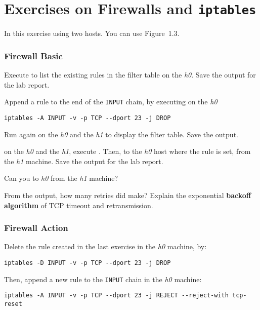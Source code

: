 \documentclass{../UTNetLab}
\begin{document}
\part{Exercises on Firewalls and \texttt{iptables}}
In this exercise using two hosts.
You can use Figure~1.3.

\section{Firewall Basic}
Execute  to list the existing rules in the filter table on the \textit{h0}.
Save the output for the lab report.

Append a rule to the end of the \texttt{INPUT} chain, by executing on the \textit{h0}
\begin{lstlisting}[morekeywords={[3]INPUT,TCP,DROP}]
iptables -A INPUT -v -p TCP --dport 23 -j DROP
    \end{lstlisting}

Run  again on the \textit{h0} and the \textit{h1} to display the filter table.
Save the output.

on the \textit{h0} and the \textit{h1}, execute .
Then,  to the \textit{h0} host where the rule is set, from the \textit{h1} machine.
Save the  output for the lab report.

\begin{report}
    \item Can you  to \textit{h0} from the \textit{h1} machine?

    \item From the  output, how many retries did  make?
    Explain the exponential \textbf{backoff algorithm} of TCP timeout and retransmission.
\end{report}

\section{Firewall Action}
Delete the rule created in the last exercise in the \textit{h0} machine, by:
\begin{lstlisting}[morekeywords={[3]INPUT,TCP,DROP}]
iptables -D INPUT -v -p TCP --dport 23 -j DROP
    \end{lstlisting}

Then, append a new rule to the \texttt{INPUT} chain in the \textit{h0} machine:
\begin{lstlisting}[morekeywords={[3]INPUT,TCP,REJECT,tcp-reset}]
iptables -A INPUT -v -p TCP --dport 23 -j REJECT --reject-with tcp-reset
    \end{lstlisting}
\end{document}

